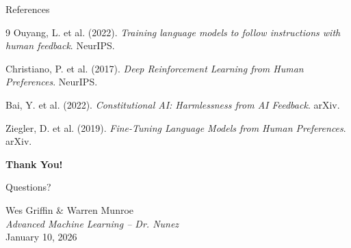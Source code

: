 \documentclass[aspectratio=169,11pt]{beamer}
\begin{document}
\begin{frame}{References}
\small
\begin{thebibliography}{9}
 Ouyang, L. et al. (2022). \textit{Training language models to follow instructions with human feedback}. NeurIPS.

 Christiano, P. et al. (2017). \textit{Deep Reinforcement Learning from Human Preferences}. NeurIPS.

 Bai, Y. et al. (2022). \textit{Constitutional AI: Harmlessness from AI Feedback}. arXiv.

 Ziegler, D. et al. (2019). \textit{Fine-Tuning Language Models from Human Preferences}. arXiv.
\end{thebibliography}
\end{frame}

\begin{frame}
\begin{center}
\Huge{\textbf{Thank You!}}

\vspace{1cm}
\Large{Questions?}

\vspace{1cm}
\normalsize
Wes Griffin \& Warren Munroe\\
\textit{Advanced Machine Learning -- Dr. Nunez}\\
January 10, 2026
\end{center}
\end{frame}
\end{document}
